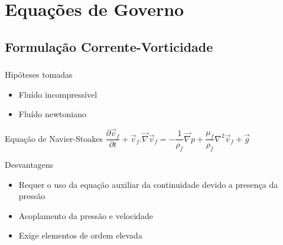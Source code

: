 \documentclass{beamer}
\begin{document}
\section{Equações de Governo}

\subsection{Formulação Corrente-Vorticidade}
\begin{frame}
  \frametitle{\subsecname}
  
  \begin{block}{Hipóteses tomadas}
    \begin{itemize}
     \item Fluído incompressível
     \item Fluído newtoniano
    \end{itemize}
  \end{block}
  
  \begin{block}{Equação de Navier-Stoakes}
    \centering
    $\dfrac{\partial \vec{v}_f}{\partial t} + \vec{v}_f.\vec{\nabla}\vec{v}_f =
    -\dfrac{1}{\rho_f} \vec{\nabla}p + \dfrac{\mu_f}{\rho_f} \nabla^2\vec{v}_f + \vec{g}$
  \end{block}
  
  \begin{block}{Desvantagens}
    \begin{itemize}
     \item Requer o uso da equação auxiliar da continuidade devido a presença da pressão
     \item Acoplamento da pressão e velocidade
     \item Exige elementos de ordem elevada
    \end{itemize}
  \end{block}
\end{frame}
\end{document}

